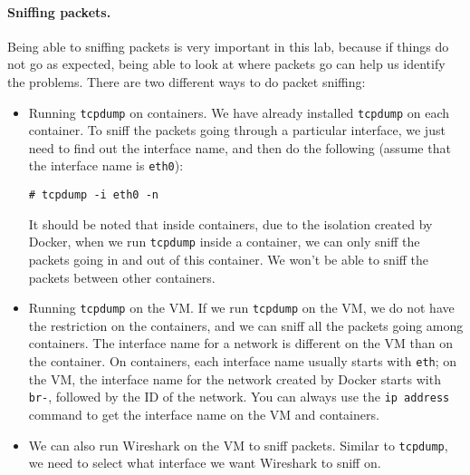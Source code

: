 
\paragraph{Sniffing packets.} Being able to sniffing packets is very
important in this lab, because if things do not go as expected, being
able to look at where packets go can help us identify the problems.
There are two different ways to do packet sniffing:


\begin{itemize}
\item Running \texttt{tcpdump} on containers.
We have already installed \texttt{tcpdump}
on each container. To sniff the packets going through a particular
interface, we just need to find out the interface name, and then do the
following (assume that the interface name is \texttt{eth0}):

\begin{lstlisting}
# tcpdump -i eth0 -n
\end{lstlisting}

It should be noted that inside containers, due to the isolation created by
Docker, when we run \texttt{tcpdump} inside a container,
we can only sniff the packets going in and out of this container.
We won't be able to sniff the packets between other containers.


\item Running \texttt{tcpdump} on the VM. If we run \texttt{tcpdump}
on the VM, we do not have the restriction on the containers, and
we can sniff all the packets going among containers. The interface
name for a network is different on the VM than on the container.
On containers, each interface name usually starts with \texttt{eth};
on the VM, the interface name for the network created
by Docker starts with \texttt{br-}, followed by the ID of the network.
You can always use the \texttt{ip address} command to get the
interface name on the VM and containers.

\item We can also run Wireshark on the VM to sniff packets.
Similar to \texttt{tcpdump}, we need to select what interface
we want Wireshark to sniff on.
\end{itemize}


